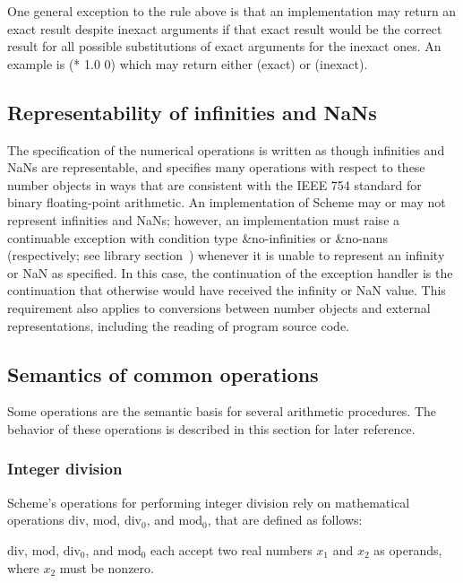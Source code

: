 One general exception to the rule above is that an implementation may
return an exact result despite inexact arguments if that exact result
would be the correct result for all possible substitutions of exact
arguments for the inexact ones.  An example is {\cf (* 1.0 0)} which
may return either {} (exact) or {} (inexact).

\subsection{Representability of infinities and NaNs}
\label{infinitiesnanssection}

The specification of the numerical operations is written as though
infinities and NaNs are representable, and specifies many operations
with respect to these number objects in ways that are consistent with the
IEEE 754 standard for binary floating-point arithmetic.  
An implementation of Scheme may or may not represent infinities and
NaNs; however,
an implementation must raise a continuable exception with
condition type {\cf\&no-infinities} or {\cf\&no-nans} (respectively;
see library section~)
whenever it is unable to represent an infinity or NaN as specified. 
In this case, the continuation of the exception
handler is the continuation that otherwise would have received
the infinity or NaN value.  This requirement also applies to
conversions between number objects and external representations, including
the reading of program source code.

\subsection{Semantics of common operations}

Some operations are the semantic basis for several arithmetic
procedures.  The behavior of these operations is described in this
section for later reference.

\subsubsection{Integer division}
\label{integerdivision}

Scheme's operations for performing integer
division rely on mathematical operations $\mathrm{div}$,
$\mathrm{mod}$, $\mathrm{div}_0$, and
$\mathrm{mod}_0$, that are defined as follows:

$\mathrm{div}$, $\mathrm{mod}$, $\mathrm{div}_0$, and $\mathrm{mod}_0$
each accept two real numbers $x_1$ and $x_2$ as operands, where
$x_2$ must be nonzero.

